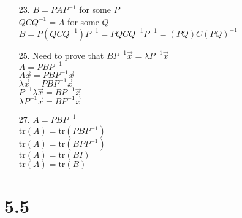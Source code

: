 \documentclass[leqno]{article}
\begin{document}
\begin{enumerate}
    \item[23.]
    $B = PAP^{-1}$ for some $P$\\
    $QCQ^{-1} = A$ for some $Q$\\
    $B = P(QCQ^{-1})P^{-1} = PQCQ^{-1}P^{-1} = (PQ)C(PQ)^{-1}$

    \item[25.]
    Need to prove that $BP^{-1}\Vec x = \lambda P^{-1}\Vec x$\\
    $A = PBP^{-1}$\\
    $A\Vec x = PBP^{-1}\Vec x$\\
    $\lambda\Vec x = PBP^{-1}\Vec x$\\
    $P^{-1}\lambda\Vec x = BP^{-1}\Vec x$\\
    $\lambda P^{-1}\Vec x = BP^{-1}\Vec x$

    \item[27.]
    \newcommand{\tr}{\mathrm{tr}}
    $A = PBP^{-1}$\\
    $\tr(A) = \tr(PBP^{-1})$\\
    $\tr(A) = \tr(BPP^{-1})$\\
    $\tr(A) = \tr(BI)$\\
    $\tr(A) = \tr(B)$
\end{enumerate}

\section*{5.5}
\end{document}
